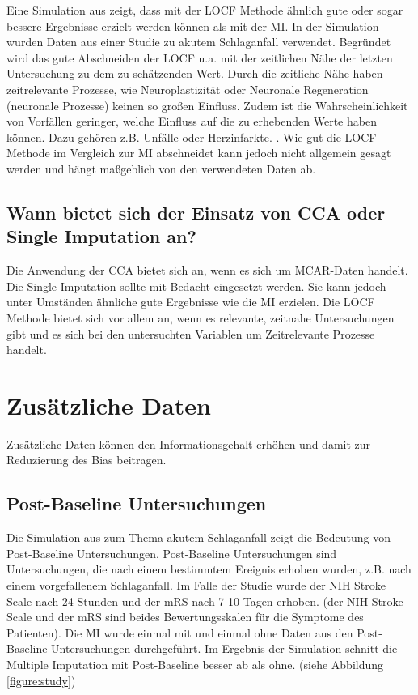 Eine Simulation aus \textcite[]{Young-Saver2018} zeigt, dass mit der LOCF Methode ähnlich gute oder sogar bessere 
Ergebnisse erzielt werden können als mit der MI. In der Simulation wurden Daten aus einer Studie zu akutem Schlaganfall 
verwendet. Begründet wird das gute Abschneiden der LOCF u.a. mit der zeitlichen Nähe der letzten Untersuchung zu dem zu 
schätzenden Wert. Durch die zeitliche Nähe haben zeitrelevante Prozesse, wie Neuroplastizität oder Neuronale Regeneration 
(neuronale Prozesse) keinen so großen Einfluss. Zudem ist die Wahrscheinlichkeit von Vorfällen geringer, welche Einfluss 
auf die zu erhebenden Werte haben können. Dazu gehören z.B. Unfälle oder Herzinfarkte. \autocite[3667]{Young-Saver2018}. 
Wie gut die LOCF Methode im Vergleich zur MI abschneidet kann jedoch nicht allgemein gesagt werden und hängt maßgeblich 
von den verwendeten Daten ab. 


\subsection{Wann bietet sich der Einsatz von CCA oder Single Imputation an?}

Die Anwendung der CCA bietet sich an, wenn es sich um MCAR-Daten handelt. 
Die Single Imputation sollte mit Bedacht eingesetzt werden. Sie kann jedoch unter Umständen ähnliche gute Ergebnisse 
wie die MI erzielen. Die LOCF Methode bietet sich vor allem an, wenn es relevante, zeitnahe Untersuchungen gibt und es 
sich bei den untersuchten Variablen um Zeitrelevante Prozesse handelt. 


\section{Zusätzliche Daten}
\label{section:additional_data}

Zusätzliche Daten können den Informationsgehalt erhöhen und damit zur Reduzierung des Bias beitragen.

\subsection{Post-Baseline Untersuchungen}

Die Simulation aus \textcite[]{Young-Saver2018} zum Thema akutem Schlaganfall zeigt die Bedeutung von Post-Baseline Untersuchungen. Post-Baseline Untersuchungen sind
 Untersuchungen, die nach einem bestimmtem Ereignis erhoben wurden, z.B. nach einem vorgefallenem Schlaganfall. Im Falle der Studie wurde der NIH Stroke Scale 
 nach 24 Stunden und der mRS nach 7-10 Tagen erhoben. (der NIH Stroke Scale und der mRS sind beides Bewertungsskalen
  für die Symptome des Patienten). Die MI wurde einmal mit und einmal ohne Daten aus den Post-Baseline Untersuchungen 
  durchgeführt. Im Ergebnis der Simulation schnitt die Multiple Imputation mit Post-Baseline besser ab als ohne. (siehe Abbildung \ref{figure:study})

